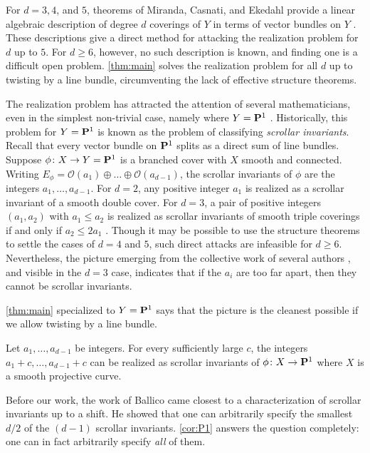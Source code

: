\documentclass[11 pt]{amsart}
\renewcommand{\O}{{\mathcal O}}
\renewcommand {\P}{{\bf P}}
\providecommand {\from}{{\colon}}
\numberwithin{equation}{section}
\begin{document}
For $d = 3, 4$, and $5$, theorems of Miranda, Casnati, and Ekedahl provide a linear algebraic description of degree $d$ coverings of $Y$ in terms of vector bundles on $Y$ \cite{mir:85,cas.eke:96}.
These descriptions give a direct method for attacking the realization problem for $d$ up to $5$.
For $d \geq 6$, however, no such description is known, and finding one is a difficult open problem.
\autoref{thm:main} solves the realization problem for all $d$ up to twisting by a line bundle, circumventing the lack of effective structure theorems.

The realization problem has attracted the attention of several mathematicians, even in the simplest non-trivial case, namely where $Y = \P^1$ \cite{ohb:97,cop:99, sch:86, bal:01}.
Historically, this problem for $Y = \P^1$ is known as the problem of classifying \emph{scrollar invariants}.
Recall that every vector bundle on $\P^1$ splits as a direct sum of line bundles.
Suppose $\phi \from X \to Y = \P^1$ is a branched cover with $X$ smooth and connected.
Writing $E_\phi = \O(a_{1}) \oplus \dots \oplus \O(a_{d-1})$, the scrollar invariants of $\phi$ are the integers $a_1, \dots, a_{d-1}$. 
For $d = 2$, any positive integer $a_1$ is realized as a scrollar invariant of a smooth double cover.
For $d = 3$, a pair of positive integers $(a_1, a_2)$ with $a_1 \leq a_2$ is realized as scrollar invariants of smooth triple coverings if and only if $a_2\leq 2a_1$ \cite[\S~9]{mir:85}.
Though it may be possible to use the structure theorems to settle the cases of $d = 4$ and $5$, such direct attacks are infeasible for $d \geq 6$.
Nevertheless, the picture emerging from the collective work of several authors \cite{cop:99,ohb:97}, and visible in the $d = 3$ case, indicates that if the $a_i$ are too far apart, then they cannot be scrollar invariants.

\autoref{thm:main} specialized to $Y = \P^1$ says that the picture is the cleanest possible if we allow twisting by a line bundle.
\begin{corollary}
  \label{cor:P1}
  Let $a_1, \dots, a_{d-1}$ be integers.
  For every sufficiently large $c$, the integers $a_1 + c, \dots, a_{d-1}+c$ can be realized as scrollar invariants of $\phi \from X \to \P^1$ where $X$ is a smooth projective curve.
\end{corollary}
Before our work, the work of Ballico \cite{bal:01} came closest to a characterization of scrollar invariants up to a shift.
He showed that one can arbitrarily specify the smallest $d/2$ of the $(d-1)$ scrollar invariants.
\autoref{cor:P1} answers the question completely: one can in fact arbitrarily specify \emph{all} of them.
\end{document}
